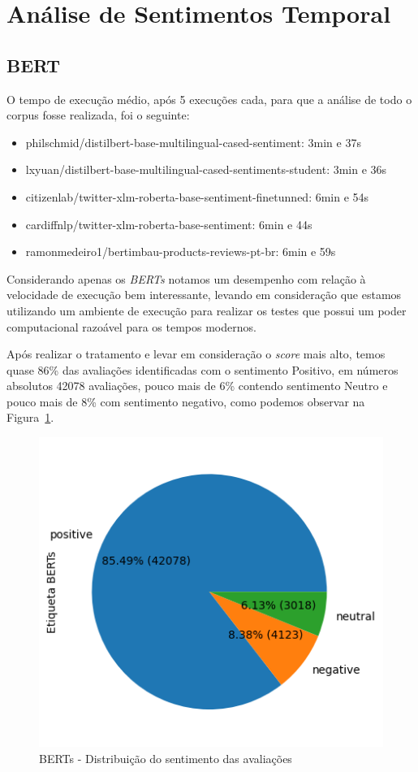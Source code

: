 \section{Análise de Sentimentos Temporal}
\label{cap:resultados:sec:analise_sentimento}

\subsection[BERT]{BERT}
\label{sec:resultados:subsec:bert}

O tempo de execução médio, após 5 execuções cada, para que a análise de todo o corpus fosse realizada, foi o seguinte:

\begin{itemize}
	\item philschmid/distilbert-base-multilingual-cased-sentiment: 3min e 37s
	\item lxyuan/distilbert-base-multilingual-cased-sentiments-student: 3min e 36s
	\item citizenlab/twitter-xlm-roberta-base-sentiment-finetunned: 6min e 54s
	\item cardiffnlp/twitter-xlm-roberta-base-sentiment: 6min e 44s
	\item ramonmedeiro1/bertimbau-products-reviews-pt-br: 6min e 59s
\end{itemize}

Considerando apenas os \textit{BERTs} notamos um desempenho com relação à velocidade de execução bem interessante, levando em consideração que estamos utilizando um ambiente de execução para realizar os testes que possui um poder computacional razoável para os tempos modernos.

Após realizar o tratamento e levar em consideração o \textit{score} mais alto, temos quase 86\% das avaliações identificadas com o sentimento Positivo, em números absolutos 42078 avaliações, pouco mais de 6\% contendo sentimento Neutro e pouco mais de 8\% com sentimento negativo, como podemos observar na Figura~\ref{img:sentimento_bert}.

\begin{figure}
	\centering
	\includegraphics{figs/bert/distribuicao_pizza.png}
	\caption{BERTs - Distribuição do sentimento das avaliações}
	\label{img:sentimento_bert}
\end{figure}

